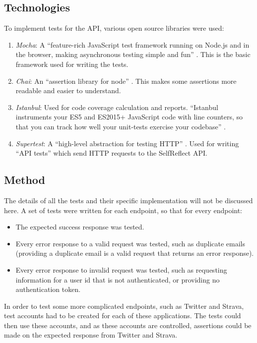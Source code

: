\documentclass[11pt,openright,a4paper]{report}
\begin{document}
\subsection{Technologies}
To implement tests for the API, various open source libraries were used:
\begin{enumerate}
\item \emph{Mocha}: A \enquote{feature-rich JavaScript test framework running on Node.js and in the browser, making asynchronous testing simple and fun} \parencite{mocha}. This is the basic framework used for writing the tests.
\item \emph{Chai}: An \enquote{assertion library for node} \parencite{chai}. This makes some assertions more readable and easier to understand.
\item \emph{Istanbul}: Used for code coverage calculation and reports. \enquote{Istanbul instruments your ES5 and ES2015+ JavaScript code with line counters, so that you can track how well your unit-tests exercise your codebase} \parencite{instanbul}.
\item \emph{Supertest}: A \enquote{high-level abstraction for testing HTTP} \parencite{supertest}. Used for writing \enquote{API tests} which send HTTP requests to the SelfReflect API.
\end{enumerate}

\subsection{Method}
The details of all the tests and their specific implementation will not be discussed here. A set of tests were written for each endpoint, so that for every endpoint:
\begin{itemize}
\item The expected success response was tested.
\item Every error response to a valid request was tested, such as duplicate emails (providing a duplicate email is a valid request that returns an error response).
\item Every error response to invalid request was tested, such as requesting information for a user id that is not authenticated, or providing no authentication token.
\end{itemize}

In order to test some more complicated endpoints, such as Twitter and Strava, test accounts had to be created for each of these applications. The tests could then use these accounts, and as these accounts are controlled, assertions could be made on the expected response from Twitter and Strava.
\end{document}
